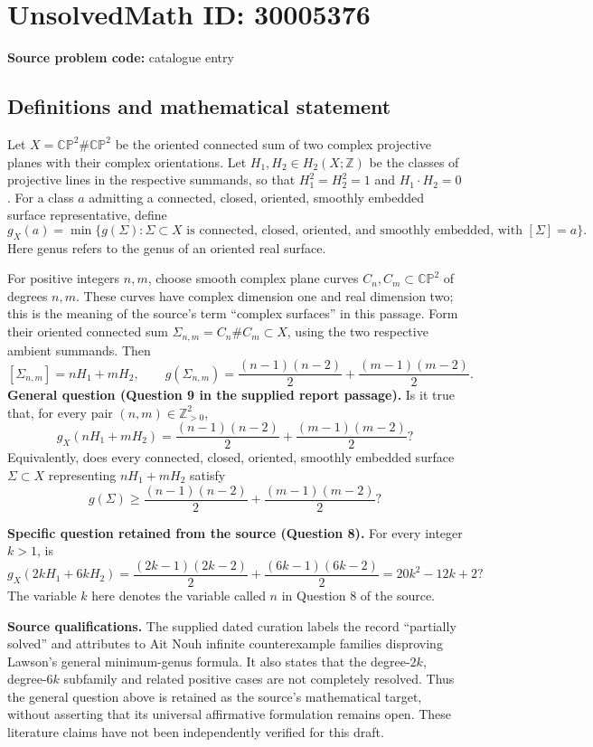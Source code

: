 \documentclass[11pt]{article}
\newcommand{\Z}{\mathbb{Z}}
\begin{document}
\section*{UnsolvedMath ID: 30005376}
\textbf{Source problem code:} catalogue entry
\subsection{Definitions and mathematical statement}
Let \(X=\mathbb{CP}^{2}\#\mathbb{CP}^{2}\) be the oriented connected sum of two complex projective planes with their complex orientations. Let \(H_1,H_2\in H_2(X;\Z)\) be the classes of projective lines in the respective summands, so that \(H_1^2=H_2^2=1\) and \(H_1\cdot H_2=0\). For a class \(a\) admitting a connected, closed, oriented, smoothly embedded surface representative, define
\[
 g_X(a)=\min\{g(\Sigma):\Sigma\subset X\text{ is connected, closed, oriented, and smoothly embedded, with }[\Sigma]=a\}.
\]
Here genus refers to the genus of an oriented real surface.

For positive integers \(n,m\), choose smooth complex plane curves \(C_n,C_m\subset\mathbb{CP}^{2}\) of degrees \(n,m\). These curves have complex dimension one and real dimension two; this is the meaning of the source's term ``complex surfaces'' in this passage. Form their oriented connected sum \(\Sigma_{n,m}=C_n\# C_m\subset X\), using the two respective ambient summands. Then
\[
 [\Sigma_{n,m}]=nH_1+mH_2,\qquad
 g(\Sigma_{n,m})=\frac{(n-1)(n-2)}{2}+\frac{(m-1)(m-2)}{2}.
\]
\textbf{General question (Question 9 in the supplied report passage).} Is it true that, for every pair \((n,m)\in\Z_{>0}^{2}\),
\[
 g_X(nH_1+mH_2)=\frac{(n-1)(n-2)}{2}+\frac{(m-1)(m-2)}{2}?
\]
Equivalently, does every connected, closed, oriented, smoothly embedded surface \(\Sigma\subset X\) representing \(nH_1+mH_2\) satisfy
\[
 g(\Sigma)\geq\frac{(n-1)(n-2)}{2}+\frac{(m-1)(m-2)}{2}?
\]

\textbf{Specific question retained from the source (Question 8).} For every integer \(k>1\), is
\[
 g_X(2kH_1+6kH_2)
 =\frac{(2k-1)(2k-2)}{2}+\frac{(6k-1)(6k-2)}{2}
 =20k^2-12k+2?
\]
The variable \(k\) here denotes the variable called \(n\) in Question 8 of the source.

\textbf{Source qualifications.} The supplied dated curation labels the record ``partially solved'' and attributes to Ait Nouh infinite counterexample families disproving Lawson's general minimum-genus formula. It also states that the degree-\(2k\), degree-\(6k\) subfamily and related positive cases are not completely resolved. Thus the general question above is retained as the source's mathematical target, without asserting that its universal affirmative formulation remains open. These literature claims have not been independently verified for this draft.
\end{document}
